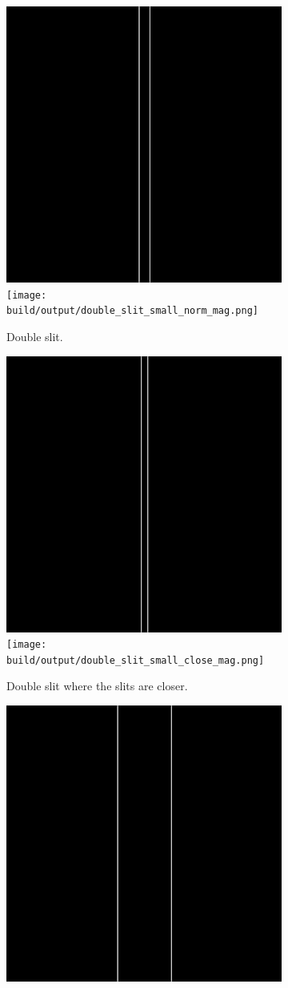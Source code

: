 \begin{figure}[htbp]
    \centering
    \begin{subfigure}[h]{\linewidth}
        \centering
        \includegraphics[width=.49\linewidth]{images/double_slit_small_norm.png}
        \texttt{[image: build/output/double\_slit\_small\_norm\_mag.png]}
        \caption{Double slit.}
    \end{subfigure}
    \begin{subfigure}[h]{\linewidth}
        \centering
        \includegraphics[width=.49\linewidth]{images/double_slit_small_close.png}
        \texttt{[image: build/output/double\_slit\_small\_close\_mag.png]}
        \caption{Double slit where the slits are closer.}
    \end{subfigure}
    \begin{subfigure}[h]{\linewidth}
        \centering
        \includegraphics[width=.49\linewidth]{images/double_slit_small_widest.png}

\end{subfigure}
\end{figure}
